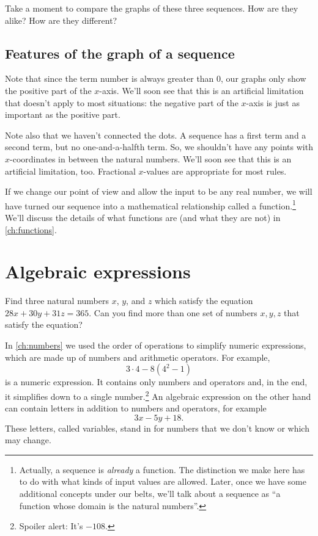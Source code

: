 Take a moment to compare the graphs of these three sequences. How are they alike? How are they different?

\subsection{Features of the graph of a sequence}

Note that since the term number is always greater than 0, our graphs only show the positive part of the $x$-axis. We'll soon see that this is an artificial limitation that doesn't apply to most situations: the negative part of the $x$-axis is just as important as the positive part.

Note also that we haven't connected the dots. A sequence has a first term and a second term, but no one-and-a-halfth term. So, we shouldn't have any points with $x$-coordinates in between the natural numbers. We'll soon see that this is an artificial limitation, too. Fractional $x$-values are appropriate for most rules.

If we change our point of view and allow the input to be any real number, we will have turned our sequence into a mathematical relationship called a \gls{function}.\footnote{Actually, a sequence is \textit{already} a function. The distinction we make here has to do with what kinds of input values are allowed. Later, once we have some additional concepts under our belts, we'll talk about a sequence as ``a function whose domain is the natural numbers''.} We'll discuss the details of what functions are (and what they are not) in \cref{ch:functions}.


\section{Algebraic expressions}
\label{sec:algexpr}

\begin{boxexplore}
Find three natural numbers $x$, $y$, and $z$ which satisfy the equation $28x + 30y + 31z = 365$. Can you find more than one set of numbers $x,y,z$ that satisfy the equation?
\end{boxexplore}

In \cref{ch:numbers} we used the order of operations to simplify numeric expressions, which are made up of numbers and arithmetic operators. For example, \[3\cdot4-8(4^2-1)\] is a numeric expression. It contains only numbers and operators and, in the end, it simplifies down to a single number.\footnote{Spoiler alert: It's $-108$.} An \gls{algebraic expression} on the other hand can contain letters in addition to numbers and operators, for example \[3x - 5y + 18.\] These letters, called \glspl{variable}, stand in for numbers that we don't know or which may change.

